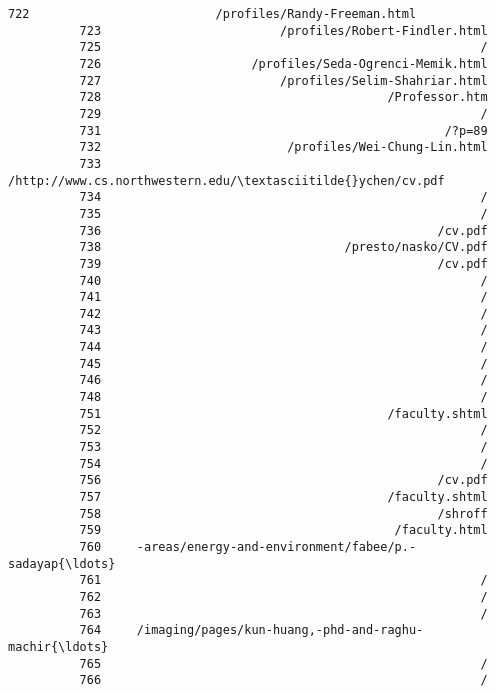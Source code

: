 \documentclass[11pt]{article}
\begin{document}
\begin{Verbatim}[commandchars=\\\{\}]
          722                          /profiles/Randy-Freeman.html
          723                         /profiles/Robert-Findler.html
          725                                                     /
          726                     /profiles/Seda-Ogrenci-Memik.html
          727                         /profiles/Selim-Shahriar.html
          728                                        /Professor.htm
          729                                                     /
          731                                                /?p=89
          732                          /profiles/Wei-Chung-Lin.html
          733         /http://www.cs.northwestern.edu/\textasciitilde{}ychen/cv.pdf
          734                                                     /
          735                                                     /
          736                                               /cv.pdf
          738                                  /presto/nasko/CV.pdf
          739                                               /cv.pdf
          740                                                     /
          741                                                     /
          742                                                     /
          743                                                     /
          744                                                     /
          745                                                     /
          746                                                     /
          748                                                     /
          751                                        /faculty.shtml
          752                                                     /
          753                                                     /
          754                                                     /
          756                                               /cv.pdf
          757                                        /faculty.shtml
          758                                               /shroff
          759                                         /faculty.html
          760     -areas/energy-and-environment/fabee/p.-sadayap{\ldots}
          761                                                     /
          762                                                     /
          763                                                     /
          764     /imaging/pages/kun-huang,-phd-and-raghu-machir{\ldots}
          765                                                     /
          766                                                     /

\end{Verbatim}
\end{document}
